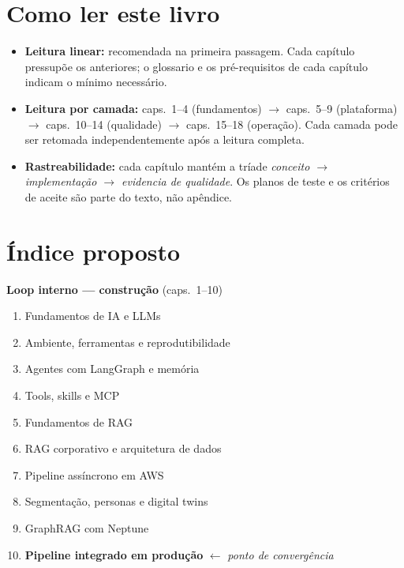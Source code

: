\section*{Como ler este livro}

\begin{itemize}[leftmargin=*, noitemsep]
  \item \textbf{Leitura linear:} recomendada na primeira passagem.
        Cada cap\'itulo pressup\~oe os anteriores; o glossario e os
        pr\'e-requisitos de cada cap\'itulo indicam o m\'inimo
        necess\'ario.
  \item \textbf{Leitura por camada:} caps.\ 1--4 (fundamentos) $\to$
        caps.\ 5--9 (plataforma) $\to$ caps.\ 10--14 (qualidade) $\to$
        caps.\ 15--18 (opera\c{c}\~ao). Cada camada pode ser retomada
        independentemente ap\'os a leitura completa.
  \item \textbf{Rastreabilidade:} cada cap\'itulo mant\'em a tríade
        \textit{conceito $\to$ implementa\c{c}\~ao $\to$ evidencia de
        qualidade}. Os planos de teste e os crit\'erios de aceite s\~ao
        parte do texto, n\~ao ap\^endice.
\end{itemize}

\section*{\'Indice proposto}

\noindent\textbf{Loop interno --- constru\c{c}\~ao} (caps.\ 1--10)
\begin{enumerate}[leftmargin=*]
  \item Fundamentos de IA e LLMs
  \item Ambiente, ferramentas e reprodutibilidade
  \item Agentes com LangGraph e mem\'oria
  \item Tools, skills e MCP
  \item Fundamentos de RAG
  \item RAG corporativo e arquitetura de dados
  \item Pipeline ass\'incrono em AWS
  \item Segmenta\c{c}\~ao, personas e digital twins
  \item GraphRAG com Neptune
  \item \textbf{Pipeline integrado em produ\c{c}\~ao} $\leftarrow$ \textit{ponto de converg\^encia}
\end{enumerate}

